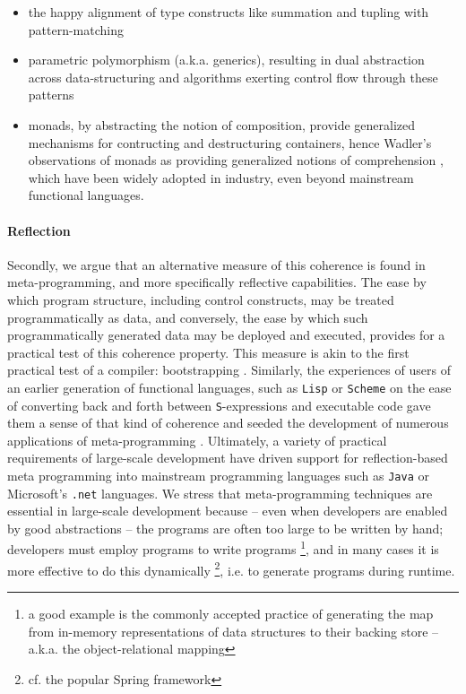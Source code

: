 \begin{itemize}
\item the happy alignment of type constructs like summation and tupling
  with pattern-matching
\item parametric polymorphism (a.k.a. generics), resulting in dual
  abstraction across data-structuring and algorithms exerting control
  flow through these patterns
\item monads, by abstracting the notion of composition, provide
  generalized mechanisms for contructing and destructuring containers,
  hence Wadler's observations of monads as providing generalized
  notions of comprehension \cite{}, which have been widely adopted in
  industry, even beyond mainstream functional languages.
\end{itemize}

\paragraph{Reflection}
Secondly, we argue that an alternative measure of this coherence is
found in meta-programming, and more specifically reflective
capabilities. The ease by which program structure, including control
constructs, may be treated programmatically as data, and conversely,
the ease by which such programmatically generated data may be deployed
and executed, provides for a practical test of this coherence
property. This measure is akin to the first practical test of a
compiler: bootstrapping \cite{}. Similarly, the experiences of users
of an earlier generation of functional languages, such as
\texttt{Lisp} or \texttt{Scheme} on the ease of converting back and
forth between \texttt{S}-expressions and executable code gave them a
sense of that kind of coherence and seeded the development of numerous
applications of meta-programming \cite{}. Ultimately, a variety of
practical requirements of large-scale development have driven support
for reflection-based meta programming into mainstream programming
languages such as \texttt{Java} or Microsoft's \texttt{.net}
languages. We stress that meta-programming techniques are essential in
large-scale development because -- even when developers are enabled by
good abstractions -- the programs are often too large to be written by
hand; developers must employ programs to write programs \footnote{a
  good example is the commonly accepted practice of generating the map
  from in-memory representations of data structures to their backing
  store -- a.k.a. the object-relational mapping}, and in many cases it
is more effective to do this dynamically \footnote{cf. the popular
  Spring framework}, i.e. to generate programs during runtime.

